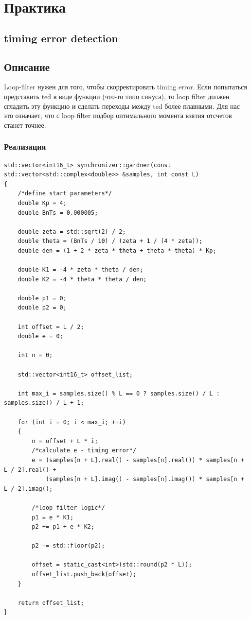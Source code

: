 \chapter{Практика}
\label{ch:intro}

\section{timing error detection}

\section{Описание}

Loop-filter нужен для того, чтобы скорректировать timing error. Если попытаться представить ted в виде 
функции (что-то типо синуса), то loop filter должен сгладить эту функцию и сделать переходы между ted более плавными. Для нас это означает,
что с loop filter подбор оптимального момента взятия отсчетов станет точнее. 

\subsection{Реализация}

\begin{lstlisting}
std::vector<int16_t> synchronizer::gardner(const std::vector<std::complex<double>> &samples, int const L)
{
    /*define start parameters*/
    double Kp = 4;
    double BnTs = 0.000005;

    double zeta = std::sqrt(2) / 2;
    double theta = (BnTs / 10) / (zeta + 1 / (4 * zeta));
    double den = (1 + 2 * zeta * theta + theta * theta) * Kp;

    double K1 = -4 * zeta * theta / den;
    double K2 = -4 * theta * theta / den;

    double p1 = 0;
    double p2 = 0;

    int offset = L / 2;
    double e = 0;

    int n = 0;

    std::vector<int16_t> offset_list;

    int max_i = samples.size() % L == 0 ? samples.size() / L : samples.size() / L + 1;

    for (int i = 0; i < max_i; ++i)
    {
        n = offset + L * i;
        /*calculate e - timing error*/
        e = (samples[n + L].real() - samples[n].real()) * samples[n + L / 2].real() +
            (samples[n + L].imag() - samples[n].imag()) * samples[n + L / 2].imag();

        /*loop filter logic*/
        p1 = e * K1;
        p2 += p1 + e * K2;

        p2 -= std::floor(p2);

        offset = static_cast<int>(std::round(p2 * L));
        offset_list.push_back(offset);
    }

    return offset_list;
}
\end{lstlisting}

